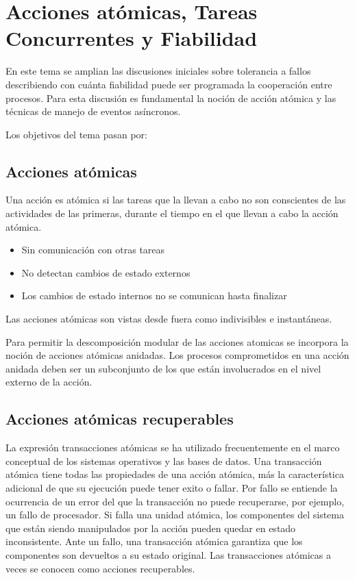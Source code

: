 \section{Acciones atómicas, Tareas Concurrentes y Fiabilidad}

En este tema se amplian las discusiones iniciales sobre tolerancia a fallos
describiendo con cuánta fiabilidad puede ser programada la cooperación entre
procesos. Para esta discusión es fundamental la noción de acción atómica y las
técnicas de manejo de eventos asíncronos.

Los objetivos del tema pasan por:

\subsection{Acciones atómicas}

Una acción es atómica si las tareas que la llevan a cabo no son conscientes de
las actividades de las primeras, durante el tiempo en el que llevan a cabo la
acción atómica.

\begin{itemize}
	\item Sin comunicación con otras tareas
	\item No detectan cambios de estado externos
	\item Los cambios de estado internos no se comunican hasta finalizar
\end{itemize}

Las acciones atómicas son vistas desde fuera como indivisibles e instantáneas.

Para permitir la descomposición modular de las acciones atomicas se incorpora la
noción de acciones atómicas anidadas. Los procesos comprometidos en una acción
anidada deben ser un subconjunto de los que están involucrados en el nivel
externo de la acción.

\subsection{Acciones atómicas recuperables}

La expresión transacciones atómicas se ha utilizado frecuentemente en el marco
conceptual de los sistemas operativos y las bases de datos. Una transacción
atómica tiene todas las propiedades de una acción atómica, más la
característica adicional de que su ejecución puede tener exito o fallar. Por
fallo se entiende la ocurrencia de un error del que la transacción no puede
recuperarse, por ejemplo, un fallo de procesador. Si falla una unidad atómica,
los componentes del sistema que están siendo manipulados por la acción pueden
quedar en estado inconsistente. Ante un fallo, una transacción atómica
garantiza que los componentes son devueltos a su estado original. Las
transacciones atómicas a veces se conocen como acciones recuperables.

